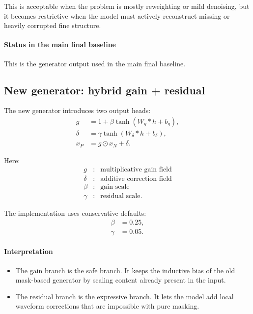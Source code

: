\documentclass[11pt]{article}
\begin{document}
This is acceptable when the problem is mostly reweighting or mild denoising, but it becomes restrictive when the model must actively reconstruct missing or heavily corrupted fine structure.

\paragraph{Status in the main final baseline}
This is the generator output used in the main final baseline.

\subsection{New generator: hybrid gain + residual}
The new generator introduces two output heads:
\begin{align}
    g &= 1 + \beta \tanh(W_g * h + b_g), \\
    \delta &= \gamma \tanh(W_{\delta} * h + b_{\delta}), \\
    x_P &= g \odot x_N + \delta.
\end{align}

Here:
\begin{align}
    g &:& \text{multiplicative gain field} \\
    \delta &:& \text{additive correction field} \\
    \beta &:& \text{gain scale} \\
    \gamma &:& \text{residual scale.}
\end{align}

The implementation uses conservative defaults:
\begin{align}
    \beta &= 0.25, \\
    \gamma &= 0.05.
\end{align}

\paragraph{Interpretation}
\begin{itemize}[leftmargin=*]
    \item The gain branch is the safe branch. It keeps the inductive bias of the old mask-based generator by scaling content already present in the input.
    \item The residual branch is the expressive branch. It lets the model add local waveform corrections that are impossible with pure masking.
\end{itemize}
\end{document}
